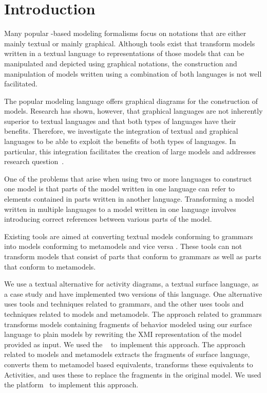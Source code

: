 \section{Introduction}
\label{sec:grammars-and-metamodels:Introduction}

Many popular \Eclipse-based modeling formalisms focus on notations that are either mainly textual or mainly graphical.
Although tools exist that transform models written in a textual language to representations of those models that can be manipulated and depicted using graphical notations, the construction and manipulation of models written using a combination of both languages is not well facilitated.

The popular modeling language \UML offers graphical diagrams for the construction of models.
Research has shown, however, that graphical languages are not inherently superior to textual languages \cite{looking-seeing} and that both types of languages have their benefits.
Therefore, we investigate the integration of textual and graphical languages to be able to exploit the benefits of both types of languages.
In particular, this integration facilitates the creation of large \UML models and addresses research question~.

\RQOne

One of the problems that arise when using two or more languages to construct one model is that parts of the model written in one language can refer to elements contained in parts written in another language.
Transforming a model written in multiple languages to a model written in one language involves introducing correct references between various parts of the model.

Existing tools are aimed at converting textual models conforming to grammars into models conforming to metamodels and vice versa \cite{TCS, Efftinge2006xText}.
These tools can not transform models that consist of parts that conform to grammars as well as parts that conform to metamodels.

We use a textual alternative for activity diagrams, a textual surface language, as a case study and have implemented two versions of this language.
One alternative uses tools and techniques related to grammars, and the other uses tools and techniques related to models and metamodels.
The approach related to grammars transforms \UML models containing fragments of behavior modeled using our surface language to plain \UML models by rewriting the XMI representation of the model provided as input.
We used the \ASFSDFME~\cite{Brand:2001:ASF} to implement this approach.
The approach related to models and metamodels extracts the fragments of surface language, converts them to metamodel based equivalents, transforms these equivalents to Activities, and uses these to replace the fragments in the original model.
We used the \OAW platform~\cite{Haase2007OAW, Voelter2006OAW} to implement this approach.

